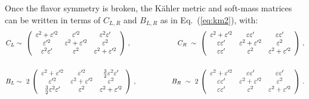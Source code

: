 \documentclass[a4paper,11pt]{article}
\newcommand{\vep}{\varepsilon}
\newcommand{\nn}{\nonumber}
\newcommand{\eq}[1]{Eq.~(\ref{#1})}
\begin{document}
Once the flavor symmetry is broken, the K\"ahler metric and soft-mass matrices can be written in terms of $C_{L,R}$ and $B_{L,R}$ as in \eq{eq:km2}, with:
\begin{align}
  C_L & \sim~ \left(\begin{array}{ccc}
               \vep^2+\vep'^2 &        \vep'^2 & \vep^2\vep' \\
                      \vep'^2 & \vep^2+\vep'^2 &   \vep^2 \\
                  \vep^2\vep' &         \vep^2 & \vep^2+\vep'^2
             \end{array} \right)\,,
  &C_R ~\sim~ \left(\begin{array}{ccc}
               \vep^2+\vep'^2 &      \vep\vep' & \vep\vep' \\
                    \vep\vep' & \vep^2+\vep'^2 &   \vep^2 \\
                    \vep\vep' &        \vep^2 & \vep^2+\vep'^2
             \end{array} \right) \,,          \\
 \nn \\
  B_L & \sim~ 2\,\left(\begin{array}{ccc}
                  \vep^2+\vep'^2 &        \vep'^2 & \frac{3}{2}\vep^2\vep' \\
                         \vep'^2 & \vep^2+\vep'^2 & \vep^2 \\
          \frac{3}{2}\vep^2\vep' &         \vep^2 & \vep^2+\vep'^2
             \end{array} \right)\,,
  & \hspace{1.5cm} B_R ~\sim~ 2\, \left(\begin{array}{ccc}
               \vep^2+\vep'^2 &      \vep\vep' & \vep\vep' \\
                    \vep\vep' & \vep^2+\vep'^2 &   \vep^2 \\
                    \vep\vep' &        \vep^2 & \vep^2+\vep'^2
             \end{array} \right) \, .  \label{eqn:S3bLbR}    
\end{align}
\end{document}
